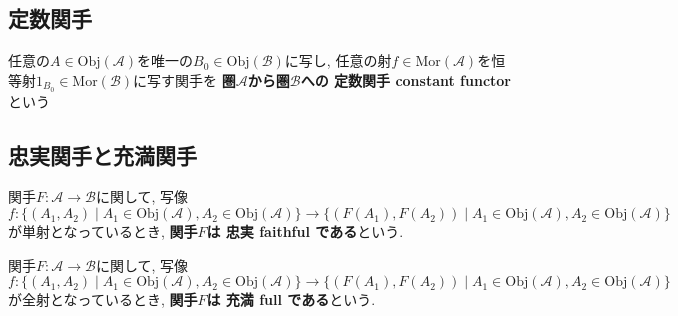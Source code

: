 \subsection{定数関手}
\begin{Def}
任意の$A\in\mathrm{Obj}(\mathscr{A})$を唯一の$B_0\in\mathrm{Obj}(\mathscr{B})$に写し,
任意の射$f\in\mathrm{Mor}(\mathscr{A})$を恒等射$1_{B_0}\in\mathrm{Mor}(\mathscr{B})$に写す関手を
{\bf 圏$\mathscr{A}$から圏$\mathscr{B}$への
定数関手 constant functor
}という
\end{Def}

\subsection{忠実関手と充満関手}
\begin{Def}
関手$F:\mathscr{A}\rightarrow\mathscr{B}$に関して,
写像
\[f:\{(A_1,A_2)\mid A_1\in\mathrm{Obj}(\mathscr{A}),A_2\in\mathrm{Obj}(\mathscr{A})\}\rightarrow\{(F(A_1),F(A_2))\mid A_1\in\mathrm{Obj}(\mathscr{A}),A_2\in\mathrm{Obj}(\mathscr{A})\}\]
が単射となっているとき,
{\bf 関手$F$は
忠実 faithful
である}という.
\end{Def}
\begin{Def}
関手$F:\mathscr{A}\rightarrow\mathscr{B}$に関して,
写像
\[f:\{(A_1,A_2)\mid A_1\in\mathrm{Obj}(\mathscr{A}),A_2\in\mathrm{Obj}(\mathscr{A})\}\rightarrow\{(F(A_1),F(A_2))\mid A_1\in\mathrm{Obj}(\mathscr{A}),A_2\in\mathrm{Obj}(\mathscr{A})\}\]
が全射となっているとき,
{\bf 関手$F$は
充満 full 
である}という.
\end{Def}

